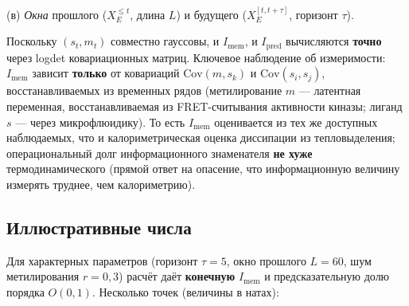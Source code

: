 \documentclass[pdflatex,sn-mathphys-ay]{sn-jnl}
\begin{document}
(в) \emph{Окна} прошлого (\(X_E^{\le t}\), длина \(L\)) и будущего (\(X_E^{[t,t+\tau]}\), горизонт \(\tau\)).

Поскольку \((s_t, m_t)\) совместно гауссовы, и \(I_{\text{mem}}\), и \(I_{\text{pred}}\) вычисляются \textbf{точно} через logdet ковариационных матриц. Ключевое наблюдение об измеримости: \(I_{\text{mem}}\) зависит \textbf{только} от ковариаций \(\text{Cov}(m, s_k)\) и \(\text{Cov}(s_i, s_j)\), восстанавливаемых из временных рядов (метилирование \(m\) --- латентная переменная, восстанавливаемая из FRET-считывания активности киназы; лиганд \(s\) --- через микрофлюидику). То есть \(I_{\text{mem}}\) оценивается из тех же доступных наблюдаемых, что и калориметрическая оценка диссипации из тепловыделения; операциональный долг информационного знаменателя \textbf{не хуже} термодинамического (прямой ответ на опасение, что информационную величину измерять труднее, чем калориметрию).

\subsection*{Иллюстративные числа}\label{ux438ux43bux43bux44eux441ux442ux440ux430ux442ux438ux432ux43dux44bux435-ux447ux438ux441ux43bux430}

Для характерных параметров (горизонт \(\tau = 5\), окно прошлого \(L = 60\), шум метилирования \(r = 0{,}3\)) расчёт даёт \textbf{конечную} \(I_{\text{mem}}\) и предсказательную долю порядка \(O(0{,}1)\). Несколько точек (величины в натах):
\end{document}
